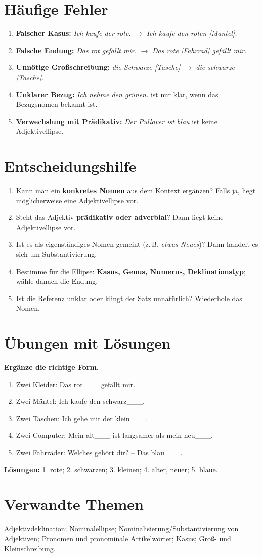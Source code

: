 \documentclass[a4paper,11pt]{article}
\begin{document}
\section{Häufige Fehler}
\begin{enumerate}
\item \textbf{Falscher Kasus:} \textit{Ich kaufe der rote.} $\rightarrow$ \textit{Ich kaufe den roten [Mantel].}
\item \textbf{Falsche Endung:} \textit{Das rot gefällt mir.} $\rightarrow$ \textit{Das rote [Fahrrad] gefällt mir.}
\item \textbf{Unnötige Großschreibung:} \textit{die Schwarze [Tasche]} $\rightarrow$ \textit{die schwarze [Tasche]}.
\item \textbf{Unklarer Bezug:} \textit{Ich nehme den grünen.} ist nur klar, wenn das Bezugsnomen bekannt ist.
\item \textbf{Verwechslung mit Prädikativ:} \textit{Der Pullover ist blau} ist keine Adjektivellipse.
\end{enumerate}

\section{Entscheidungshilfe}
\begin{enumerate}
\item Kann man ein \textbf{konkretes Nomen} aus dem Kontext ergänzen? Falls ja, liegt möglicherweise eine Adjektivellipse vor.
\item Steht das Adjektiv \textbf{prädikativ oder adverbial}? Dann liegt keine Adjektivellipse vor.
\item Ist es als eigenständiges Nomen gemeint (z.\,B. \textit{etwas Neues})? Dann handelt es sich um Substantivierung.
\item Bestimme für die Ellipse: \textbf{Kasus, Genus, Numerus, Deklinationstyp}; wähle danach die Endung.
\item Ist die Referenz unklar oder klingt der Satz unnatürlich? Wiederhole das Nomen.
\end{enumerate}

\section{Übungen mit Lösungen}
\textbf{Ergänze die richtige Form.}
\begin{enumerate}
\item Zwei Kleider: Das rot\_\_\_ gefällt mir. 
\item Zwei Mäntel: Ich kaufe den schwarz\_\_\_.
\item Zwei Taschen: Ich gehe mit der klein\_\_\_.
\item Zwei Computer: Mein alt\_\_\_ ist langsamer als mein neu\_\_\_.
\item Zwei Fahrräder: Welches gehört dir? -- Das blau\_\_\_.
\end{enumerate}
\textbf{Lösungen:} 1. rote; 2. schwarzen; 3. kleinen; 4. alter, neuer; 5. blaue.

\section{Verwandte Themen}
Adjektivdeklination; Nominalellipse; Nominalisierung/Substantivierung von Adjektiven; Pronomen und pronominale Artikelwörter; Kasus; Groß- und Kleinschreibung.
\end{document}
